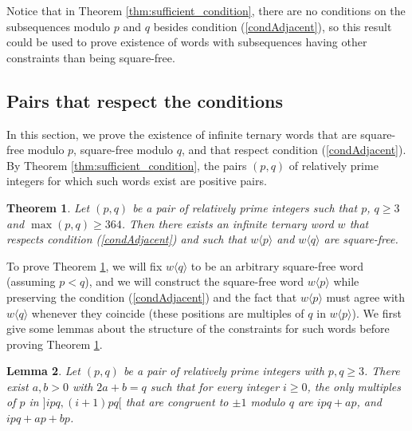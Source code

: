 \documentclass[12pt]{article}
\newtheorem{theorem}{Theorem}
\newtheorem{lemma}[theorem]{Lemma}
\theoremstyle{definition}
\newcommand{\subsequence}[2]{#1\langle#2\rangle}
\begin{document}
Notice that in Theorem \ref{thm:sufficient_condition}, there are no conditions on the subsequences modulo $p$ and $q$ besides condition (\ref{condAdjacent}), so this result could be used to prove existence of words with subsequences having other constraints than being square-free.

\subsection{Pairs that respect the conditions}\label{sec:pairs_that_respect_the_condition}

In this section, we prove the existence of infinite ternary words that are square-free modulo $p$, square-free modulo $q$, and that respect condition (\ref{condAdjacent}). By Theorem \ref{thm:sufficient_condition}, the pairs $(p, q)$ of relatively prime integers for which such words exist are positive pairs.

\begin{theorem}\label{thm:pq_coprime_st_w_respect_star_and_is_sqfree}
    Let $(p, q)$ be a pair of relatively prime integers such that $p$, $q \ge 3$ and $\max(p, q) \ge 364$. Then there exists an infinite ternary word $w$ that respects condition (\ref{condAdjacent}) and such that $\subsequence{w}{p}$ and $\subsequence{w}{q}$ are square-free.
\end{theorem}

To prove Theorem \ref{thm:pq_coprime_st_w_respect_star_and_is_sqfree}, we will fix $\subsequence{w}{q}$ to be an arbitrary square-free word (assuming $p<q$), and we will construct the square-free word $\subsequence{w}{p}$ while preserving the condition (\ref{condAdjacent}) and the fact that $\subsequence{w}{p}$ must agree with $\subsequence{w}{q}$ whenever they coincide (these positions are multiples of $q$ in $\subsequence{w}{p}$).
We first give some lemmas about the structure of the constraints for such words before proving Theorem \ref{thm:pq_coprime_st_w_respect_star_and_is_sqfree}.



\begin{lemma}\label{lemma:description_of_constraints_distance_for_p_q_coprime}
    Let $(p, q)$ be a pair of relatively prime integers with $p, q \ge 3$. There exist $a,b>0$ with $2a + b = q$ such that for every integer $i \ge 0$, the only multiples of $p$ in $]ipq, (i + 1)pq[$ that are congruent to $\pm 1$ modulo $q$ are $ipq + ap$, and $ipq + ap + bp$.
\end{lemma}
\end{document}
